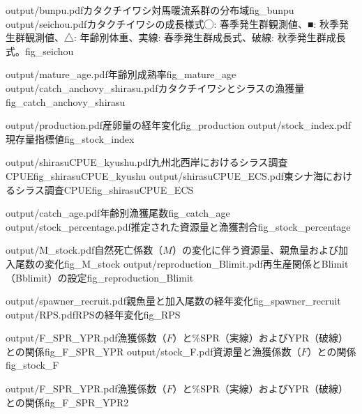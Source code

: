 \TwoOfSixFigs
{output/bunpu.pdf}{カタクチイワシ対馬暖流系群の分布域}{fig_bunpu}
{output/seichou.pdf}{カタクチイワシの成長様式\newline◯: 春季発生群観測値、■: 秋季発生群観測値、△: 年齢別体重、実線: 春季発生群成長式、破線: 秋季発生群成長式。}{fig_seichou}

\TwoOfSixFigs
{output/mature_age.pdf}{年齢別成熟率}{fig_mature_age}
{output/catch_anchovy_shirasu.pdf}{カタクチイワシとシラスの漁獲量}{fig_catch_anchovy_shirasu}

\TwoOfSixFigs
{output/production.pdf}{産卵量の経年変化}{fig_production}
{output/stock_index.pdf}{現存量指標値}{fig_stock_index}

\TwoOfSixFigs
{output/shirasuCPUE_kyushu.pdf}{九州北西岸におけるシラス調査CPUE}{fig_shirasuCPUE_kyushu}
{output/shirasuCPUE_ECS.pdf}{東シナ海におけるシラス調査CPUE}{fig_shirasuCPUE_ECS}

\TwoOfSixFigs
{output/catch_age.pdf}{年齢別漁獲尾数}{fig_catch_age}
{output/stock_percentage.pdf}{推定された資源量と漁獲割合}{fig_stock_percentage}

\TwoOfSixFigs
{output/M_stock.pdf}{自然死亡係数（$M$）の変化に伴う資源量、親魚量および加入尾数の変化}{fig_M_stock}
{output/reproduction_Blimit.pdf}{再生産関係とBlimit（Bblimit）の設定}{fig_reproduction_Blimit}

\TwoOfSixFigs
{output/spawner_recruit.pdf}{親魚量と加入尾数の経年変化}{fig_spawner_recruit}
{output/RPS.pdf}{RPSの経年変化}{fig_RPS}

\TwoOfSixFigs
{output/F_SPR_YPR.pdf}{漁獲係数（$F$）と\%SPR（実線）およびYPR（破線）との関係}{fig_F_SPR_YPR}
{output/stock_F.pdf}{資源量と漁獲係数（$F$）との関係}{fig_stock_F}

\OneOfSixFigs
{output/F_SPR_YPR.pdf}{漁獲係数（$F$）と\%SPR（実線）およびYPR（破線）との関係}{fig_F_SPR_YPR2}